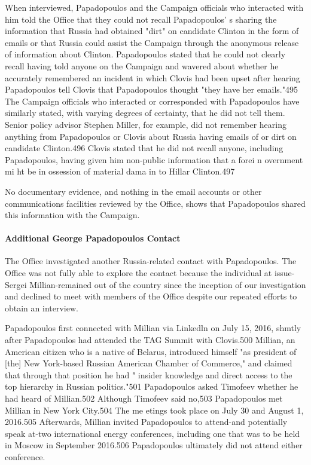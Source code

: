 When interviewed, Papadopoulos and the Campaign officials who interacted with him told the Office that they could not recall Papadopoulos' s  sharing the information that Russia had obtained "dirt" on candidate Clinton in the form of emails or that Russia could assist the Campaign through the anonymous release of information about Clinton. Papadopoulos stated that he could not clearly recall having told anyone on the Campaign and wavered about whether he accurately remembered an incident in which Clovis had been upset after hearing Papadopoulos tell Clovis that Papadopoulos thought "they have her emails."495 The Campaign officials who interacted or corresponded with Papadopoulos have similarly stated, with varying degrees of certainty, that he did not tell them. Senior policy advisor Stephen Miller, for example, did not remember hearing anything from Papadopoulos or Clovis about Russia having emails of or dirt on candidate Clinton.496 Clovis stated that he did not recall anyone, including Papadopoulos, having given him non-public information that a forei n overnment mi ht be in ossession of material dama in to Hillar Clinton.497

No documentary evidence, and nothing in the email accounts or other communications facilities reviewed by the Office, shows that Papadopoulos shared this information with the Campaign.

\paragraph{Additional George Papadopoulos Contact}

The Office investigated another Russia-related contact with Papadopoulos. The Office was not fully able to explore the contact because the individual at issue-Sergei Millian-remained out of the country since the inception of our investigation and declined to meet with members of the Office despite our repeated efforts to obtain an interview.

Papadopoulos first connected with Millian via Linkedln on July 15, 2016, shmtly after Papadopoulos had attended the TAG Summit with Clovis.500 Millian, an American citizen who is a native of Belarus, introduced himself "as president of [the] New York-based Russian American Chamber of Commerce," and claimed that through that position he had " insider knowledge and direct access to the top hierarchy in Russian politics."501 Papadopoulos asked Timofeev whether he had heard of Millian.502 Although Timofeev said no,503 Papadopoulos met Millian in New York City.504 The me etings took place on July 30 and August 1, 2016.505 Afterwards, Millian invited Papadopoulos to attend-and potentially speak at-two international energy conferences, including one that was to be held in Moscow in September 2016.506 Papadopoulos ultimately did not attend either conference.

